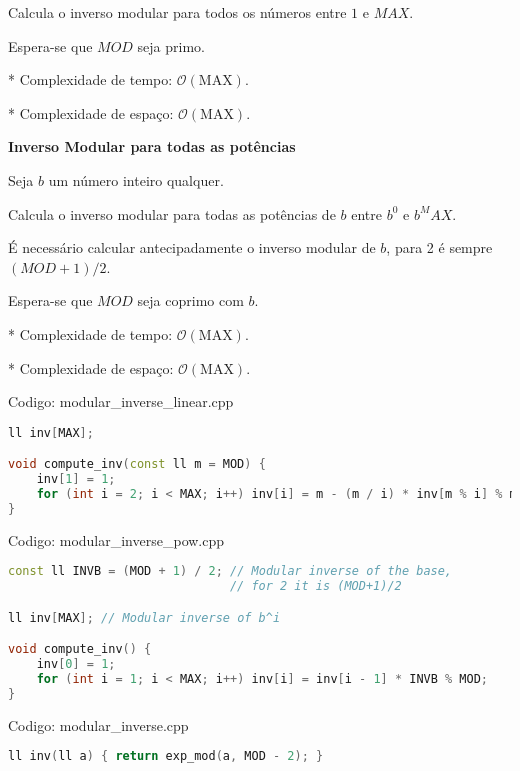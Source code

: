 \documentclass[10pt, a4paper, oneside]{book}
\begin{document}
Calcula o inverso modular para todos os números entre $1$ e $MAX$.



Espera-se que $MOD$ seja primo.



* Complexidade de tempo: $\mathcal{O}(\text{MAX})$.

* Complexidade de espaço: $\mathcal{O}(\text{MAX})$.



\textbf{Inverso Modular para todas as potências} 



Seja $b$ um número inteiro qualquer.



Calcula o inverso modular para todas as potências de $b$ entre $b^0$ e $b^MAX$.



É necessário calcular antecipadamente o inverso modular de $b$, para 2 é sempre $(MOD+1)/2$.



Espera-se que $MOD$ seja coprimo com $b$.



* Complexidade de tempo: $\mathcal{O}(\text{MAX})$.

* Complexidade de espaço: $\mathcal{O}(\text{MAX})$.
\hfill

Codigo: modular\_inverse\_linear.cpp

\begin{lstlisting}[language=C++]
ll inv[MAX];

void compute_inv(const ll m = MOD) {
    inv[1] = 1;
    for (int i = 2; i < MAX; i++) inv[i] = m - (m / i) * inv[m % i] % m;
}
\end{lstlisting}
\hfill

Codigo: modular\_inverse\_pow.cpp

\begin{lstlisting}[language=C++]
const ll INVB = (MOD + 1) / 2; // Modular inverse of the base,
                               // for 2 it is (MOD+1)/2

ll inv[MAX]; // Modular inverse of b^i

void compute_inv() {
    inv[0] = 1;
    for (int i = 1; i < MAX; i++) inv[i] = inv[i - 1] * INVB % MOD;
}
\end{lstlisting}
\hfill

Codigo: modular\_inverse.cpp

\begin{lstlisting}[language=C++]
ll inv(ll a) { return exp_mod(a, MOD - 2); }
\end{lstlisting}
\hfill
\end{document}
